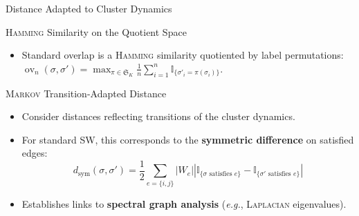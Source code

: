 \documentclass[A4,svgnames,9pt,aspectratio=169]{beamer}
\newcommand{\ov}{\operatorname{ov}}
\newcommand{\ind}[1]{\mathbb{I}_{\{#1\}}}
\begin{document}
\begin{frame}{Distance Adapted to Cluster Dynamics}
  \begin{block}{\textsc{Hamming} Similarity on the Quotient Space}
    \begin{itemize}
      \item Standard overlap is a \textsc{Hamming} similarity quotiented by label permutations:
        $\ov_n(\sigma, \sigma') = \max_{\pi \in \mathfrak{S}_K} \frac{1}{n} \sum_{i=1}^n \ind{\sigma'_i = \pi(\sigma_i)}$.
    \end{itemize}
  \end{block}

  \begin{block}{\textsc{Markov} Transition-Adapted Distance}
    \begin{itemize}
      \item Consider distances reflecting transitions of the cluster dynamics.
      \item For standard SW, this corresponds to the \textbf{symmetric difference} on satisfied edges:
        $$d_{\mathrm{sym}}(\sigma, \sigma') = \frac{1}{2} \sum_{e=\{i,j\}} |W_e| \left| \ind{\sigma \text{ satisfies } e} - \ind{\sigma' \text{ satisfies } e} \right|$$
      \item Establishes links to \textbf{spectral graph analysis} (\emph{e.g.}, \textsc{Laplacian} eigenvalues).
    \end{itemize}
  \end{block}
\end{frame}
\end{document}
